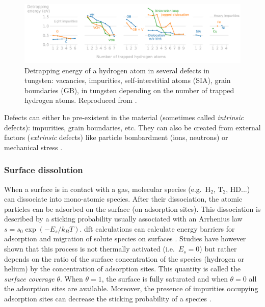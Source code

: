\begin{figure}
    \centering
    \includegraphics[width=\linewidth]{Figures/Chapter1/trapping_energy_hydrogen_in_tungsten.pdf}
    \caption{Detrapping energy of a hydrogen atom in several defects in tungsten: vacancies, impurities, self-interstitial atoms (SIA), grain boundaries (GB), in tungsten depending on the number of trapped hydrogen atoms. Reproduced from \cite{hodille_study_2016}.}
\end{figure}

Defects can either be pre-existent in the material (sometimes called \textit{intrinsic} defects): impurities, grain boundaries, etc.
They can also be created from external factors (\textit{extrinsic} defects) like particle bombardment (ions, neutrons)  or mechanical stress .

\subsubsection{Surface dissolution}

When a surface is in contact with a gas, molecular species (e.g.\ $\text{H}_2$, $\text{T}_2$, $\text{HD}$...) can dissociate into mono-atomic species.
After their dissociation, the atomic particles can be adsorbed on the surface (on adsorption sites).
This dissociation is described by a sticking probability usually associated with an Arrhenius law $s = s_0 \exp{(-E_s/k_B T)}$.
\gls{dft} calculations can calculate energy barriers for adsorption and migration of solute species on surfaces .
Studies have however shown that this process is not thermally activated (i.e.\ $E_s=0$)  but rather depends on the ratio of the surface concentration of the species (hydrogen or helium) by the concentration of adsorption sites.
This quantity is called the \textit{surface coverage} $\theta$. 
When $\theta = 1$, the surface is fully saturated and when $\theta = 0$ all the adsorption sites are available.
Moreover, the presence of impurities occupying adsorption sites can decrease the sticking probability of a species .

